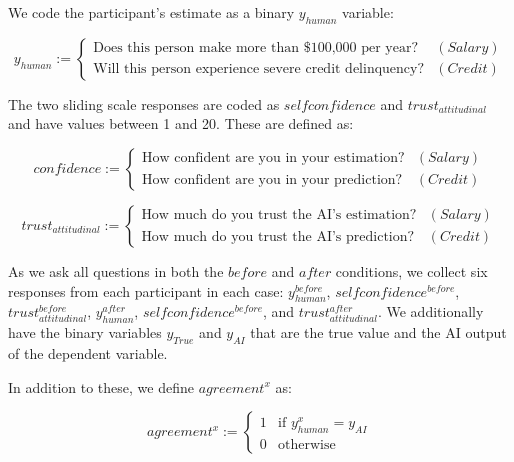 We code the participant's estimate as a binary $y_{human}$ variable:

\begin{equation}
    y_{human} := \begin{cases}
        \text{Does this person make more than \$100,000 per year?} & (Salary) \\
        \text{Will this person experience severe credit delinquency?} & (Credit)
    \end{cases}
\end{equation}

\noindent The two sliding scale responses are coded as $selfconfidence$ and $trust_{attitudinal}$ and have values between 1 and 20. These are defined as:

\begin{equation}
    confidence := \begin{cases}
        \text{How confident are you in your estimation?} & (Salary) \\
        \text{How confident are you in your prediction?} & (Credit)
    \end{cases}
\end{equation}

\begin{equation}
    trust_{attitudinal} := \begin{cases}
        \text{How much do you trust the AI's estimation?} & (Salary) \\
        \text{How much do you trust the AI's prediction?} & (Credit)
    \end{cases}
\end{equation}

As we ask all questions in both the $before$ and $after$ conditions, we collect six responses from each participant in each case: $y_{human}^{before}$, $selfconfidence^{before}$, $trust_{attitudinal}^{before}$, $y_{human}^{after}$, $selfconfidence^{before}$, and $trust_{attitudinal}^{after}$.  We additionally have the binary variables $y_{True}$ and $y_{AI}$ that are the true value and the AI output of the dependent variable.

In addition to these, we define $agreement^{x}$ as:

\begin{equation}
    agreement^{x} := \begin{cases}
        1 & \text{if } y_{human}^{x} = y_{AI} \\
        0 & \text{otherwise}
    \end{cases}
\end{equation}

